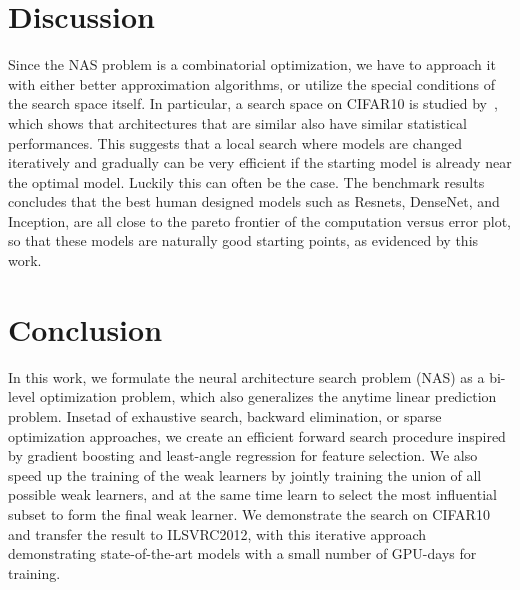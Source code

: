 \section{Discussion}
\label{sec:discussion}
Since the NAS problem is a combinatorial optimization, we have to approach it with either better approximation algorithms, or utilize the special conditions of the search space itself. 
In particular, a search space on CIFAR10 is studied by~\citep{nasbench}, which shows that architectures that are similar also have similar statistical performances. 
This suggests that a local search where models are changed iteratively and gradually can be very efficient if the starting model is already near the optimal model.
Luckily this can often be the case. The benchmark results concludes that the best human designed models such as Resnets, DenseNet, and Inception, are all close to 
the pareto frontier of the computation versus error plot, so that these models are naturally good starting points, as evidenced by this work. 



\section{Conclusion}
\label{sec:conclusion}
In this work, we formulate the neural architecture search problem (NAS) as a bi-level optimization problem, which also generalizes the anytime linear prediction problem.
Insetad of exhaustive search, backward elimination, or sparse optimization approaches, we create an efficient forward search procedure inspired by gradient boosting and least-angle regression for feature selection. We also speed up the training of the weak learners by jointly training the union of all possible weak learners,
and at the same time learn to select the most influential subset to form the final weak learner. We demonstrate the search on CIFAR10 and transfer the result to ILSVRC2012,
with this iterative approach demonstrating state-of-the-art models with a small number of GPU-days for training.


%
%







%
